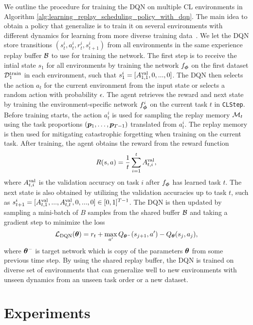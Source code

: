 We outline the procedure for training the DQN on multiple CL environments in Algorithm \ref{alg:learning_replay_scheduling_policy_with_dqn}. The main idea to obtain a policy that generalize is to train it on several environments with different dynamics for learning from more diverse training data~\cite{zhang2018dissection}. We let the DQN store transitions $(s_{t}^{i}, a_{t}^{i}, r_{t}^{i}, s_{t+1}^{i})$ from all environments in the same experience replay buffer ${\mathcal{B}}$ to use for training the network. The first step is to receive the intial state $s_1$ for all environments by training the network $f_{{\bm{\phi}}}$ on the first dataset ${\mathcal{D}}_1^{{\text{train}}}$ in each environment, such that $s_{1}^{i} = [A_{1,1}^{{\text{val}}}, 0, ..., 0]$. The DQN then selects the action $a_t$ for the current environment from the input state or selects a random action with probability $\epsilon$. The agent retrieves the reward and next state by training the environment-specific network $f_{{\bm{\phi}}}^{i}$ on the current task $t$ in \texttt{CLStep}. Before training starts, the action $a_{t}^{i}$ is used for sampling the replay memory ${\mathcal{M}}_t$ using the task proportions $({\bm{p}}_1, \dots, {\bm{p}}_{T-1})$ translated from $a_{t}^{i}$. The replay memory is then used for mitigating catastrophic forgetting when training on the current task. After training, the agent obtains the reward from the reward function 
\begin{align}
	R(s, a) = \frac{1}{t} \sum_{i=1}^{t} A_{t, i}^{{\text{val}}},
\end{align}
where $A_{t, i}^{{\text{val}}}$ is the validation accuracy on task $i$ after $f_{{\bm{\phi}}}$ has learned task $t$. The next state is also obtained by utilizing the validation accuracies up to task $t$, such as $s_{t+1}^{i} = [A_{t, 1}^{{\text{val}}}, ..., A_{t, t}^{{\text{val}}}, 0, ..., 0] \in [0, 1]^{T-1}$. The DQN is then updated by sampling a mini-batch of $B$ samples from the shared buffer ${\mathcal{B}}$ and taking a gradient step to minimize the loss
\begin{align}
	{\mathcal{L}}_{\text{DQN}}({\bm{\theta}}) = r_t + \max_{a'} Q_{{\bm{\theta}}^{-}}(s_{j+1}, a') - Q_{{\bm{\theta}}}(s_j, a_j), 
\end{align}  
where ${\bm{\theta}}^{-}$ is target network which is copy of the parameters ${\bm{\theta}}$ from some previous time step. By using the shared replay buffer, the DQN is trained on diverse set of environments that can generalize well to new environments with unseen dynamics from an unseen task order or a new dataset. 





\section{Experiments}


